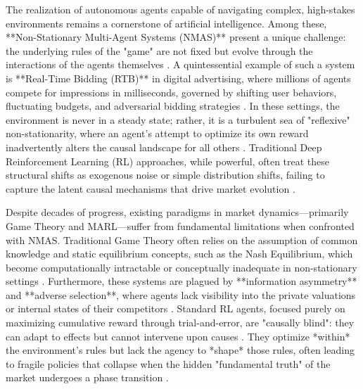 The realization of autonomous agents capable of navigating complex, high-stakes environments remains a cornerstone of artificial intelligence. Among these, **Non-Stationary Multi-Agent Systems (NMAS)** present a unique challenge: the underlying rules of the "game" are not fixed but evolve through the interactions of the agents themselves \cite{Littman1994, Mazzaglia2022}. A quintessential example of such a system is **Real-Time Bidding (RTB)** in digital advertising, where millions of agents compete for impressions in milliseconds, governed by shifting user behaviors, fluctuating budgets, and adversarial bidding strategies \cite{Zhang2024}. In these settings, the environment is never in a steady state; rather, it is a turbulent sea of "reflexive" non-stationarity, where an agent's attempt to optimize its own reward inadvertently alters the causal landscape for all others \cite{DaCosta2023}. Traditional Deep Reinforcement Learning (RL) approaches, while powerful, often treat these structural shifts as exogenous noise or simple distribution shifts, failing to capture the latent causal mechanisms that drive market evolution \cite{Hinton2006, Sutton2018}.

Despite decades of progress, existing paradigms in market dynamics—primarily Game Theory and MARL—suffer from fundamental limitations when confronted with NMAS. Traditional Game Theory often relies on the assumption of common knowledge and static equilibrium concepts, such as the Nash Equilibrium, which become computationally intractable or conceptually inadequate in non-stationary settings \cite{Osborne1994, Lanctot2017}. Furthermore, these systems are plagued by **information asymmetry** and **adverse selection**, where agents lack visibility into the private valuations or internal states of their competitors \cite{Aumann1995}. Standard RL agents, focused purely on maximizing cumulative reward through trial-and-error, are "causally blind": they can adapt to effects but cannot intervene upon causes \cite{Sutton2018, Pearl2009}. They optimize *within* the environment's rules but lack the agency to *shape* those rules, often leading to fragile policies that collapse when the hidden "fundamental truth" of the market undergoes a phase transition \cite{Peters2017, Gao2024}.

